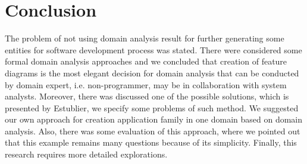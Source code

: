 \documentclass[conference]{IEEEtran}
\begin{document}
\section{Conclusion}
\label{chapter:conclusion}
The problem of not using domain analysis result for further generating some entities for software development process was stated. There were considered some formal domain analysis approaches and we concluded that creation of feature diagrams is the most elegant decision for domain analysis that can be conducted by domain expert, i.e. non-programmer, may be in collaboration with system analysts. Moreover, there was discussed one of the possible solutions, which is presented by Estublier, we specify some problems of such method. We suggested our own approach for creation application family in one domain based on domain analysis. Also, there was some evaluation of this approach, where we pointed out that this example remains many questions because of its simplicity. Finally, this research requires more detailed explorations.   



\end{document}
